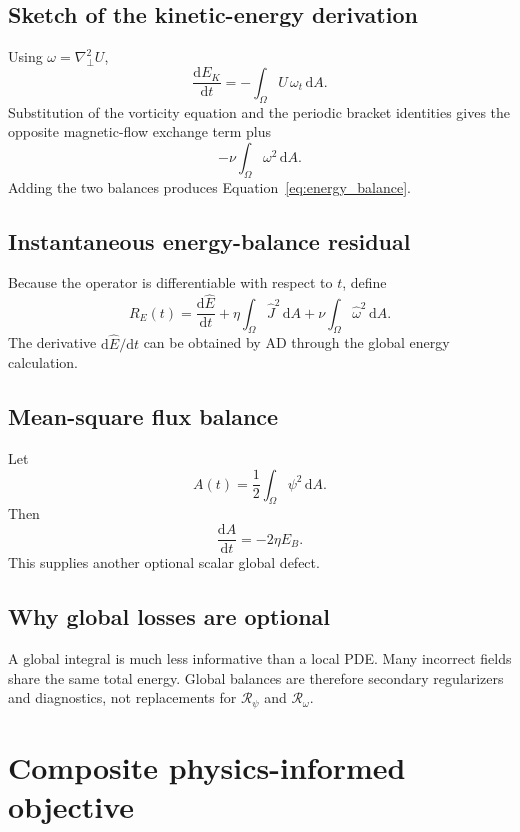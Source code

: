\documentclass[11pt]{article}
\newcommand{\dd}{\mathrm{d}}
\newcommand{\Lap}{\nabla_\perp^2}
\newcommand{\Rpsi}{\mathcal{R}_{\psi}}
\newcommand{\Romega}{\mathcal{R}_{\omega}}
\begin{document}
\subsection{Sketch of the kinetic-energy derivation}
Using $\omega=\Lap U$,
\begin{equation}
\frac{\dd E_K}{\dd t}
=-\int_\Omega U\,\omega_t\,\dd A.
\end{equation}
Substitution of the vorticity equation and the periodic bracket identities gives the opposite magnetic-flow exchange term plus
\begin{equation}
-\nu\int_\Omega\omega^2\,\dd A.
\end{equation}
Adding the two balances produces Equation~\eqref{eq:energy_balance}.

\subsection{Instantaneous energy-balance residual}
Because the operator is differentiable with respect to $t$, define
\begin{equation}
R_E(t)=
\frac{\dd \widehat E}{\dd t}
+\eta\int_\Omega \widehat J^2\,\dd A
+\nu\int_\Omega \widehat\omega^2\,\dd A.
\end{equation}
The derivative $\dd\widehat E/\dd t$ can be obtained by AD through the global energy calculation.

\subsection{Mean-square flux balance}
Let
\begin{equation}
A(t)=\frac12\int_\Omega\psi^2\,\dd A.
\end{equation}
Then
\begin{equation}
\frac{\dd A}{\dd t}=-2\eta E_B.
\label{eq:mean_square_flux}
\end{equation}
This supplies another optional scalar global defect.

\subsection{Why global losses are optional}
A global integral is much less informative than a local PDE. Many incorrect fields share the same total energy. Global balances are therefore secondary regularizers and diagnostics, not replacements for $\Rpsi$ and $\Romega$.

\section{Composite physics-informed objective}
\label{sec:objective}
\end{document}
